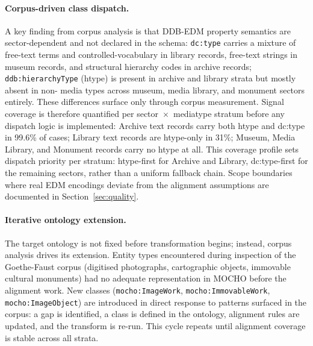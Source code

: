 \paragraph{Corpus-driven class dispatch.}
A key finding from corpus analysis is that DDB-EDM property semantics are sector-dependent and not declared in the schema: \texttt{dc:type} carries a mixture of free-text terms and controlled-vocabulary in library records, free-text strings in museum records, and structural hierarchy codes in archive records; \texttt{ddb:hierarchyType} (htype) is present in archive and library strata but mostly absent in  non- media types across museum, media library, and monument sectors entirely.
These differences surface only through corpus measurement.
Signal coverage is therefore quantified per sector~$\times$~mediatype stratum before any dispatch logic is implemented: Archive text records carry both htype and dc:type in 99.6\% of cases; Library text records are htype-only in 31\%; Museum, Media Library, and Monument records carry no htype at all.
This coverage profile sets dispatch priority per stratum: htype-first for Archive and Library, dc:type-first for the remaining sectors, rather than a uniform fallback chain.
Scope boundaries where real EDM encodings deviate from the alignment assumptions are documented in Section~\ref{sec:quality}.

\paragraph{Iterative ontology extension.}
The target ontology is not fixed before transformation begins; instead, corpus analysis drives its extension.
Entity types encountered during inspection of the Goethe-Faust corpus (digitised photographs, cartographic objects, immovable cultural monuments) had no adequate representation in MOCHO before the alignment work.
New classes (\texttt{mocho:ImageWork}, \texttt{mocho:ImmovableWork}, \texttt{mocho:ImageObject}) are introduced in direct response to patterns surfaced in the corpus: a gap is identified, a class is defined in the ontology, alignment rules are updated, and the transform is re-run.
This cycle repeats until alignment coverage is stable across all strata.

